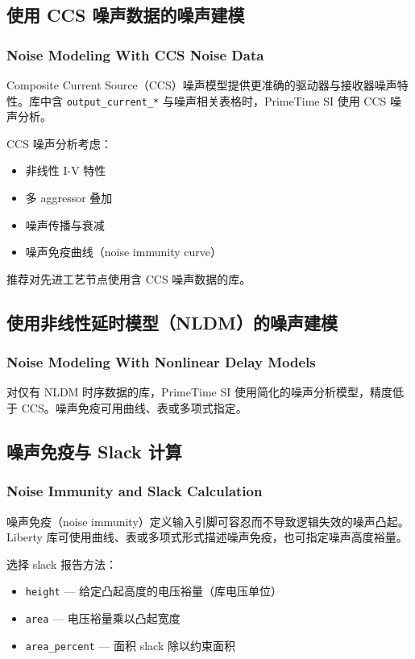 \subsection{使用 CCS 噪声数据的噪声建模}
\subsubsection*{Noise Modeling With CCS Noise Data}

Composite Current Source（CCS）噪声模型提供更准确的驱动器与接收器噪声特性。库中含 \texttt{output\_current\_*} 与噪声相关表格时，PrimeTime SI 使用 CCS 噪声分析。

CCS 噪声分析考虑：
\begin{itemize}
  \item 非线性 I-V 特性
  \item 多 aggressor 叠加
  \item 噪声传播与衰减
  \item 噪声免疫曲线（noise immunity curve）
\end{itemize}

推荐对先进工艺节点使用含 CCS 噪声数据的库。

\subsection{使用非线性延时模型（NLDM）的噪声建模}
\subsubsection*{Noise Modeling With Nonlinear Delay Models}

对仅有 NLDM 时序数据的库，PrimeTime SI 使用简化的噪声分析模型，精度低于 CCS。噪声免疫可用曲线、表或多项式指定。

\subsection{噪声免疫与 Slack 计算}
\subsubsection*{Noise Immunity and Slack Calculation}

噪声免疫（noise immunity）定义输入引脚可容忍而不导致逻辑失效的噪声凸起。Liberty 库可使用曲线、表或多项式形式描述噪声免疫，也可指定噪声高度裕量。

 选择 slack 报告方法：
\begin{itemize}
  \item \texttt{height} — 给定凸起高度的电压裕量（库电压单位）
  \item \texttt{area} — 电压裕量乘以凸起宽度
  \item \texttt{area\_percent} — 面积 slack 除以约束面积
\end{itemize}

